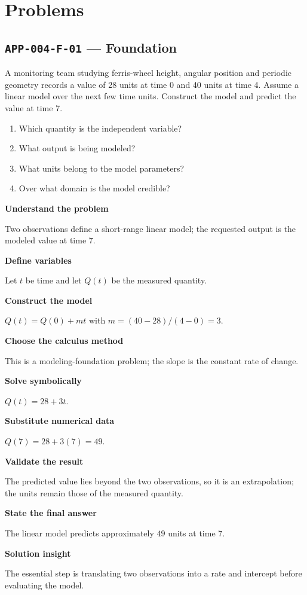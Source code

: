 \documentclass[11pt]{book}
\newcommand{\pid}[1]{\texttt{#1}}
\begin{document}
\section*{Problems}
\subsection*{\pid{APP-004-F-01} — Foundation}
\begin{problembox}
A monitoring team studying ferris-wheel height, angular position and periodic geometry records a value of 28 units at time 0 and 40 units at time 4. Assume a linear model over the next few time units. Construct the model and predict the value at time 7.
\end{problembox}
\begin{promptbox}\begin{enumerate}
\item Which quantity is the independent variable?
\item What output is being modeled?
\item What units belong to the model parameters?
\item Over what domain is the model credible?
\end{enumerate}\end{promptbox}
\begin{solutionbox}
\textbf{Understand the problem}\par Two observations define a short-range linear model; the requested output is the modeled value at time 7.\par\medskip
\textbf{Define variables}\par Let $t$ be time and let $Q(t)$ be the measured quantity.\par\medskip
\textbf{Construct the model}\par $Q(t)=Q(0)+mt$ with $m=(40-28)/(4-0)=3$.\par\medskip
\textbf{Choose the calculus method}\par This is a modeling-foundation problem; the slope is the constant rate of change.\par\medskip
\textbf{Solve symbolically}\par $Q(t)=28+3t$.\par\medskip
\textbf{Substitute numerical data}\par $Q(7)=28+3(7)=49$.\par\medskip
\textbf{Validate the result}\par The predicted value lies beyond the two observations, so it is an extrapolation; the units remain those of the measured quantity.\par\medskip
\textbf{State the final answer}\par The linear model predicts approximately $49$ units at time 7.\par\medskip
\textbf{Solution insight}\par The essential step is translating two observations into a rate and intercept before evaluating the model.\par\medskip
\end{solutionbox}
\end{document}
